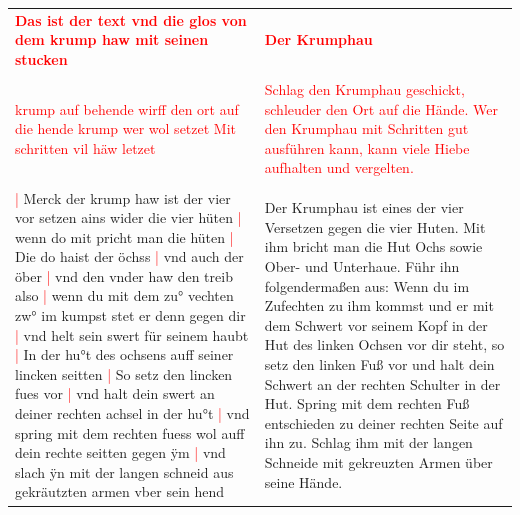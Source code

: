 \begin{longtable}{p{6.25cm}p{6.25cm}}
    \textbf{\textcolor{red}{
        Das ist der text vnd die glos von dem krump haw mit seinen stucken}}
    &
    \textbf{\textcolor{red}{
        Der Krumphau}}
    \\
    \\
    \textcolor{red}{
        krump auf behende wirff den ort auf die hende
        krump wer wol setzet Mit schritten vil häw letzet}
    &
    \textcolor{red}{
        Schlag den Krumphau geschickt, schleuder den Ort auf die Hände.
        Wer den Krumphau mit Schritten gut ausführen kann, kann viele Hiebe aufhalten und vergelten.}
    \\
    \\
    \textcolor{red}{|} Merck der krump haw ist der vier vor setzen ains wider die vier hüten
    \textcolor{red}{|} wenn do mit pricht man die hüten
    \textcolor{red}{|} Die do haist der öchss
    \textcolor{red}{|} vnd auch der öber
    \textcolor{red}{|} vnd den vnder haw den treib also
    \textcolor{red}{|} wenn du mit dem zu° vechten zw° im kumpst stet er denn gegen dir
    \textcolor{red}{|} vnd helt sein swert für seinem haubt
    \textcolor{red}{|} In der hu°t des ochsens auff seiner lincken seitten
    \textcolor{red}{|} So setz den lincken fues vor
    \textcolor{red}{|} vnd halt dein swert an deiner rechten achsel in der hu°t
    \textcolor{red}{|} vnd spring mit dem rechten fuess wol auff dein rechte seitten gegen ÿm
    \textcolor{red}{|} vnd slach ÿn mit der langen schneid aus gekräutzten armen vber sein hend
    &
    Der Krumphau ist eines der vier Versetzen gegen die vier Huten.
    Mit ihm bricht man die Hut Ochs sowie Ober- und Unterhaue.
    Führ ihn folgendermaßen aus: Wenn du im Zufechten zu ihm kommst und er mit dem Schwert vor seinem Kopf in der Hut des linken Ochsen vor dir steht, so setz den linken Fuß vor und halt dein Schwert an der rechten Schulter in der Hut.
    Spring mit dem rechten Fuß entschieden zu deiner rechten Seite auf ihn zu.
    Schlag ihm mit der langen Schneide mit gekreuzten Armen über seine Hände.
\end{longtable}

\newpage

\begin{center}
\end{center}

\newpage

